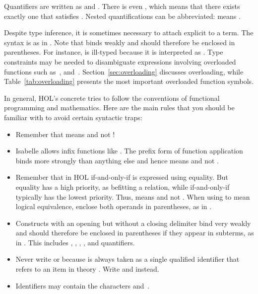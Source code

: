 Quantifiers are written as
 and . 
There is even
, which
means that there exists exactly one  that satisfies . 
Nested quantifications can be abbreviated:
 means
.%

Despite type inference, it is sometimes necessary to attach explicit
 to a term.  The syntax is
 as in . Note that
 binds weakly and should therefore be enclosed
in parentheses.  For instance,
 is ill-typed because it is interpreted as
.  Type constraints may be needed to disambiguate
expressions
involving overloaded functions such as~\isa{+}, 
\isa{*} and~\isa{<}.  Section~\ref{sec:overloading} 
discusses overloading, while Table~\ref{tab:overloading} presents the most
important overloaded function symbols.

In general, HOL's concrete  tries to follow the conventions of
functional programming and mathematics.  Here are the main rules that you
should be familiar with to avoid certain syntactic traps:
\begin{itemize}
\item
Remember that  means  and not !
\item
Isabelle allows infix functions like \isa{+}. The prefix form of function
application binds more strongly than anything else and hence 
means  and not .
\item Remember that in HOL if-and-only-if is expressed using equality.  But
  equality has a high priority, as befitting a relation, while if-and-only-if
  typically has the lowest priority.  Thus,  means  and not
  . When using \isa{=} to mean
  logical equivalence, enclose both operands in parentheses, as in .
\item
Constructs with an opening but without a closing delimiter bind very weakly
and should therefore be enclosed in parentheses if they appear in subterms, as
in .  This includes 
,
,
,
\isa{\isasymlambda}, and quantifiers.
\item
Never write  or 
because  is always taken as a single qualified identifier that
refers to an item  in theory . Write
 and  instead.
\item Identifiers may contain the characters \isa{_} 
and~.
\end{itemize}

